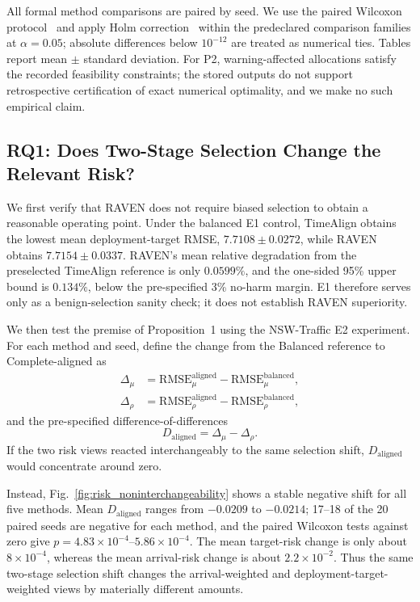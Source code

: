 \documentclass[letterpaper,journal]{IEEEtran}
\begin{document}
All formal method comparisons are paired by seed.  We use the paired
Wilcoxon protocol~\cite{wilcoxon1945individual} and apply Holm
correction~\cite{holm1979simple} within the predeclared comparison
families at $\alpha=0.05$; absolute differences below
$10^{-12}$ are treated as numerical ties.  Tables report
mean $\pm$ standard deviation.  For P2, warning-affected allocations satisfy
the recorded feasibility constraints; the stored outputs do not
support retrospective certification of exact numerical optimality, and we make
no such empirical claim.

\subsection{RQ1: Does Two-Stage Selection Change the Relevant Risk?}
\label{subsec:eval_rq1}

We first verify that RAVEN does not require biased selection to obtain a
reasonable operating point.  Under the balanced E1 control, TimeAlign obtains
the lowest mean deployment-target RMSE, $7.7108\pm0.0272$, while RAVEN obtains
$7.7154\pm0.0337$.  RAVEN's mean relative degradation from the preselected
TimeAlign reference is only $0.0599\%$, and the one-sided 95\% upper bound is
$0.134\%$, below the pre-specified 3\% no-harm margin.  E1 therefore serves only as a
benign-selection sanity check; it does not establish RAVEN superiority.

We then test the premise of Proposition~1 using the NSW-Traffic E2
experiment.  For each method and seed, define the change from the Balanced
reference to Complete-aligned as
\begin{align}
 \Delta_{\mu}
 &=
 \mathrm{RMSE}_{\mu}^{\mathrm{aligned}}
 -
 \mathrm{RMSE}_{\mu}^{\mathrm{balanced}},\\
 \Delta_{\rho}
 &=
 \mathrm{RMSE}_{\rho}^{\mathrm{aligned}}
 -
 \mathrm{RMSE}_{\rho}^{\mathrm{balanced}},
\end{align}
and the pre-specified difference-of-differences
\begin{equation}
    D_{\mathrm{aligned}}
    =
    \Delta_{\mu}-\Delta_{\rho}.
    \label{eq:D_aligned_eval}
\end{equation}
If the two risk views reacted interchangeably to the same selection shift,
$D_{\mathrm{aligned}}$ would concentrate around zero.

Instead, Fig.~\ref{fig:risk_noninterchangeability} shows a stable negative
shift for all five methods.  Mean $D_{\mathrm{aligned}}$ ranges from
$-0.0209$ to $-0.0214$; 17--18 of the 20 paired seeds are negative for each
method, and the paired Wilcoxon tests against zero give
$p=4.83\times10^{-4}$--$5.86\times10^{-4}$.  The mean target-risk change is
only about $8\times10^{-4}$, whereas the mean arrival-risk change is about
$2.2\times10^{-2}$.  Thus the same two-stage selection shift changes the
arrival-weighted and deployment-target-weighted views by materially different
amounts.
\end{document}
